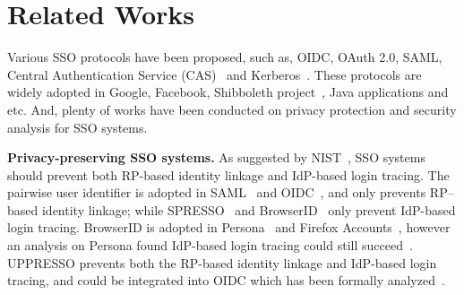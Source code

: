 \section{Related Works}%
\label{sec:related}
Various SSO  protocols have been proposed, such as, OIDC, OAuth 2.0, SAML, Central Authentication Service (CAS)~\cite{aubry2004esup} and Kerberos~\cite{Kerberos}.
These protocols are widely adopted in Google, Facebook, Shibboleth project~\cite{Shibboleth}, Java applications and etc.
And, plenty of works have been conducted on privacy protection and security analysis for SSO systems.


\noindent\textbf{Privacy-preserving SSO systems.}
As suggested by NIST~\cite{NIST2017draft}, SSO systems should prevent both  RP-based identity linkage and IdP-based login tracing.
The pairwise user identifier is adopted in SAML~\cite{SAML} and OIDC~\cite{OpenIDConnect}, and only prevents RP--based identity linkage; while SPRESSO~\cite{SPRESSO} and BrowserID~\cite{BrowserID} only prevent  IdP-based login tracing.
BrowserID is adopted in Persona~\cite{persona} and Firefox Accounts~\cite{FirefoxAccount}, however an analysis on Persona found IdP-based login tracing could still succeed~\cite{FettKS14, BrowserID}.
UPPRESSO prevents both the RP-based identity linkage and IdP-based login tracing, and could be integrated into OIDC which has been formally analyzed~\cite{FettKS17}.


